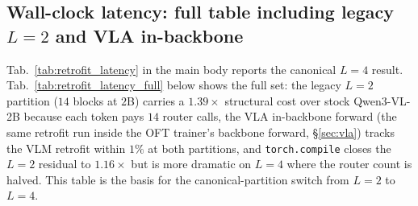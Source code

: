 \documentclass{article}
\begin{document}
\subsection{\texorpdfstring{Wall-clock latency: full table including legacy $L{=}2$ and VLA in-backbone}{Wall-clock latency: full table including legacy L=2 and VLA in-backbone}}
\label{app:latency}
Tab.~\ref{tab:retrofit_latency} in the main body reports the canonical $L{=}4$ result. Tab.~\ref{tab:retrofit_latency_full} below shows the full set: the legacy $L{=}2$ partition ($14$ blocks at $2$B) carries a $1.39\times$ structural cost over stock Qwen3-VL-2B because each token pays $14$ router calls, the VLA in-backbone forward (the same retrofit run inside the OFT trainer's backbone forward, \S\ref{sec:vla}) tracks the VLM retrofit within $1\%$ at both partitions, and \texttt{torch.compile} closes the $L{=}2$ residual to $1.16\times$ but is more dramatic on $L{=}4$ where the router count is halved. This table is the basis for the canonical-partition switch from $L{=}2$ to $L{=}4$.
\end{document}
